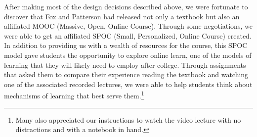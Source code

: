 After making most of the design decisions described above, we were
fortunate to discover that Fox and Patterson had released not only
a textbook \cite{saasbook} but also an affiliated MOOC (Massive,
Open, Online Course).  Through some negotiations, we were able to
get an affiliated SPOC (Small, Personalized, Online Course) created.
In addition to providing us with a wealth of resources for the
course, this SPOC model gave students the opportunity to explore
online learn, one of the models of learning that they will likely
need to employ after college.  Through assignments that asked them
to compare their experience reading the textbook and watching one
of the associated recorded lectures, we were able to help students
think about mechanisms of learning that best serve them.\footnote{Many also
appreciated our instructions to watch the video lecture with no distractions
and with a notebook in hand.}

%
%
%
%
